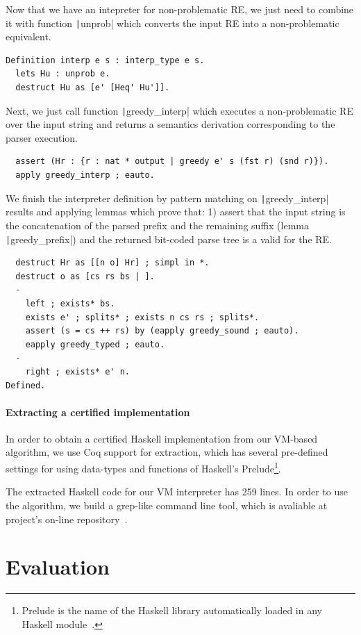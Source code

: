 \documentclass[review]{elsarticle}
\newcommand{\coq}[1]{\texttt|#1|}
\theoremstyle{definition}
\begin{document}
Now that we have an intepreter for non-problematic RE, we just need to combine
it with function \coq{unprob} which converts the input RE into 
a non-problematic equivalent. 
\begin{verbatim}
Definition interp e s : interp_type e s.
  lets Hu : unprob e.
  destruct Hu as [e' [Heq' Hu']].
\end{verbatim}
Next, we just call function \coq{greedy_interp} which executes a non-problematic
RE over the input string and returns a semantics derivation corresponding to 
the parser execution. 
\begin{verbatim}
  assert (Hr : {r : nat * output | greedy e' s (fst r) (snd r)}).
  apply greedy_interp ; eauto.
\end{verbatim}
We finish the interpreter definition by pattern matching on \coq{greedy_interp}
results and applying lemmas which prove that: 1) assert that the input string is
the concatenation of the parsed prefix and the remaining suffix (lemma
\coq{greedy_prefix}) and the returned bit-coded parse tree is a valid for the 
RE.
\begin{verbatim}
  destruct Hr as [[n o] Hr] ; simpl in *.
  destruct o as [cs rs bs | ].
  -
    left ; exists* bs.
    exists e' ; splits* ; exists n cs rs ; splits*.
    assert (s = cs ++ rs) by (eapply greedy_sound ; eauto).
    eapply greedy_typed ; eauto.
  -
    right ; exists* e' n.
Defined.
\end{verbatim}


\paragraph{Extracting a certified implementation}

In order to obtain a certified Haskell implementation from our VM-based algorithm,
we use Coq support for extraction, which has several pre-defined
settings for using data-types and functions of Haskell's
Prelude\footnote{Prelude is the name of the Haskell library automatically loaded
in any Haskell module~\cite{Haskell98}.}.

The extracted Haskell code for our VM interpreter has 259 lines. In order to use 
the algorithm, we build a grep-like command line tool, which is avaliable at 
project's on-line repository~\cite{regexvm-rep}. 

\section{Evaluation}\label{section:experiments}
\end{document}
